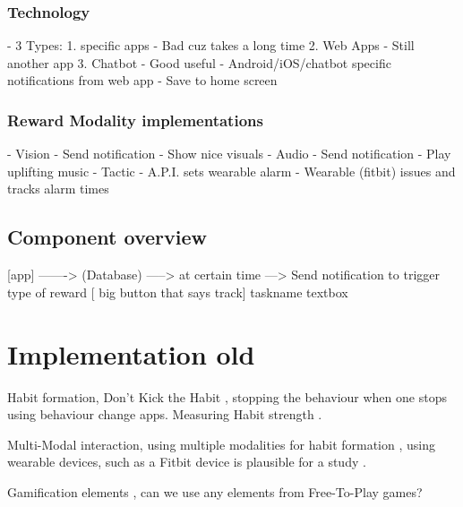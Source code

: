   \subsubsection{Technology}
      - 3 Types:
        1. specific apps
          - Bad cuz takes a long time
        2. Web Apps
          - Still another app
        3. Chatbot
          - Good useful
      - Android/iOS/chatbot specific notifications from web app
      - Save to home screen
  \subsubsection{Reward Modality implementations}
      - Vision
        - Send notification
        - Show nice visuals
      - Audio
        - Send notification
        - Play uplifting music
      - Tactic
        - A.P.I. sets wearable alarm
        - Wearable (fitbit) issues and tracks alarm times
    \subsection{Component overview}
      [app] -------> (Database) -----> at certain time ---> Send notification to trigger type of reward
      [ big button that says track]
      taskname textbox

\newpage
\section{Implementation old}

Habit formation, Don't Kick the Habit \cite{article_dont_kick_habit}, stopping the behaviour when one stops using behaviour change apps.
Measuring Habit strength \cite{article_habit_strength} \cite{article_habit_measurement}.

Multi-Modal interaction, using multiple modalities for habit formation \cite{}, using wearable devices, such as a Fitbit device is plausible for a study \cite{article_wearable_good}.

Gamification elements \cite{f2p_games_how_to}, can we use any elements from Free-To-Play games?


